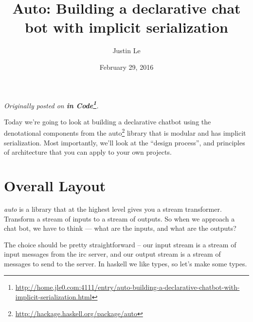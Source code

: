\documentclass[]{article}
\title{Auto: Building a declarative chat bot with implicit serialization}
\author{Justin Le}
\date{February 29, 2016}
\renewcommand{\href}[2]{#2\footnote{\url{#1}}}
\begin{document}
\maketitle

\emph{Originally posted on
\textbf{\href{http://home.jle0.com:4111/entry/auto-building-a-declarative-chatbot-with-implicit-serialization.html}{in
Code}}.}

Today we're going to look at building a declarative chatbot using the denotational components from
the \href{http://hackage.haskell.org/package/auto}{auto} library that is modular and has implicit
serialization. Most importantly, we'll look at the ``design process'', and principles of
architecture that you can apply to your own projects.

\section{Overall Layout}\label{overall-layout}

\emph{auto} is a library that at the highest level gives you a stream transformer. Transform a
stream of inputs to a stream of outputs. So when we approach a chat bot, we have to think --- what
are the inputs, and what are the outputs?

The choice should be pretty straightforward -- our input stream is a stream of input messages from
the irc server, and our output stream is a stream of messages to send to the server. In haskell we
like types, so let's make some types.
\end{document}
